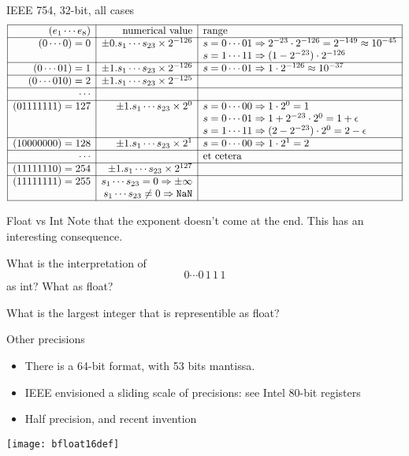\begin{numberedframe}{IEEE 754, 32-bit, all cases}
  \scriptsize
  \[
  \begin{array}{|r|r|l|}
    \hline
    (e_1\cdots e_8)&\hbox{numerical value}&\hbox{range}\\
    \hline
    (0\cdots0)=0& \pm 0.s_1\cdots s_{23}\times 2^{-126}
            &s=0\cdots 01\Rightarrow 2^{-23}\cdot 2^{-126}=2^{-149}\approx 10^{-45}\\
    &       &s=1\cdots 11\Rightarrow (1-2^{-23})\cdot 2^{-126}\\
    \hline
    (0\cdots 01)=1& \pm 1.s_1\cdots s_{23}\times 2^{-126}
            &s=0\cdots 01\Rightarrow 1 \cdot 2^{-126}\approx 10^{-37}\\
    \hline
    (0\cdots 010)=2& \pm 1.s_1\cdots s_{23}\times 2^{-125}&\\
    \hline
    \cdots&&\\
    \hline
    (01111111)=127 & \pm 1.s_1\cdots s_{23}\times 2^{0}
            &s=0\cdots 00\Rightarrow 1\cdot 2^{0}=1\\
    &       &s=0\cdots 01\Rightarrow 1+2^{-23}\cdot 2^{0}=1+\epsilon\\
    &       &s=1\cdots 11\Rightarrow (2-2^{-23})\cdot 2^{0}=2-\epsilon\\
    \hline
    (10000000)=128 & \pm 1.s_1\cdots s_{23}\times 2^{1}
            &s=0\cdots 00\Rightarrow 1\cdot 2^{1}=2\\
    \hline
    \cdots&
            &\hbox{et cetera}\\
    \hline
    (11111110)=254 & \pm 1.s_1\cdots s_{23}\times 2^{127}&\\
    \hline
    (11111111)=255 & s_1\cdots s_{23}=0 \Rightarrow \pm\infty &\\
                   & s_1\cdots s_{23}\not=0 \Rightarrow \n{NaN} &\\
    \hline
  \end{array}
  \]
\end{numberedframe}

\begin{exercise}{Float vs Int}
  Note that the exponent doesn't come at the end. This has an interesting consequence.

  What is the interpretation of
  \[ 0\cdots 0\,1\,1\,1 \]
  as int? What as float?

  What is the largest integer that is representible as float?
\end{exercise}

\begin{numberedframe}{Other precisions}
  \begin{itemize}
  \item There is a 64-bit format, with 53 bits mantissa.
  \item IEEE envisioned a sliding scale of precisions: see Intel 80-bit
    registers
  \item Half precision, and recent invention 
  \end{itemize}
  \texttt{[image: bfloat16def]}  
\end{numberedframe}


